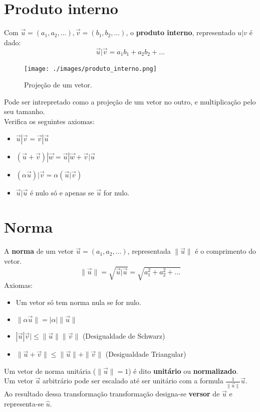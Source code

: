 \documentclass[]{report}
\begin{document}
\section{Produto interno}
Com $\vec u = (a_1, a_2, \dots), \vec v = (b_1, b_2, \dots)$, o \textbf{produto interno}, representado $u|v$ é dado:
$$\vec u | \vec v = a_1 b_1 + a_2 b_2 + \dots $$
\begin{figure}
	\vspace{-15mm}
    \begin{center}
        \texttt{[image: ./images/produto\_interno.png]}
    \end{center}
	\vspace{-5mm}
    \caption{Projeção de um vetor.}
	\vspace{-10mm}
\end{figure}
Pode ser intrepretado como a projeção de um vetor no outro, e multiplicação pelo seu tamanho.\\[2mm]
Verifica os seguintes axiomas:
\begin{itemize}
\item $\vec u| \vec v = \vec v| \vec u$
\item $(\vec u+\vec v)|\vec w = \vec u| \vec w + \vec v|\vec u$
\item $(\alpha \vec u)|\vec v = \alpha (\vec u | \vec v)$
\item $\vec u | \vec u$ é nulo só e apenas se $\vec u$ for nulo.
\end{itemize}
\section{Norma}
A \textbf{norma} de um vetor $\vec u = (a_1, a_2, \dots)$, representada $\parallel \vec u \parallel$ é o comprimento do vetor.
$$\parallel \vec u \parallel = \sqrt{\vec u | \vec u} = \sqrt{a_1^2 + a_2^2 + \dots}$$
Axiomas:
\begin{itemize}
\item Um vetor só tem norma nula se for nulo.
\item $\parallel \alpha \vec u \parallel = | \alpha| \parallel \vec u \parallel$
\item $| \vec u | \vec v | \leq \parallel \vec u \parallel \parallel \vec v \parallel$ (Desigualdade de Schwarz)
\item $\parallel \vec u  + \vec v \parallel \leq \parallel \vec u \parallel + \parallel \vec v \parallel$ (Desigualdade Triangular)
\end{itemize}
Um vetor de norma unitária ($\parallel \vec u \parallel = 1$) é dito \textbf{unitário} ou \textbf{normalizado}.\\
Um vetor $\vec u$ arbitrário pode ser escalado até ser unitário com a formula $\frac{1}{\parallel \vec u \parallel} \vec u$.\\
Ao resultado dessa transformação transformação designa-se \textbf{versor} de $\vec u$ e representa-se $\hat u$.
\end{document}

